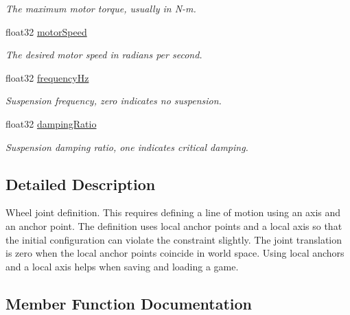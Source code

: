 \begin{DoxyCompactItemize}
\begin{DoxyCompactList}\small\item\em The maximum motor torque, usually in N-\/m. \end{DoxyCompactList}\item 
\mbox{\label{structb2WheelJointDef_a7248e25f2ca6b6c2a5f7079ce16e7748}} 
float32 \hyperlink{structb2WheelJointDef_a7248e25f2ca6b6c2a5f7079ce16e7748}{motor\+Speed}
\begin{DoxyCompactList}\small\item\em The desired motor speed in radians per second. \end{DoxyCompactList}\item 
\mbox{\label{structb2WheelJointDef_acf3540f46eaf3bc91426386939bd37b1}} 
float32 \hyperlink{structb2WheelJointDef_acf3540f46eaf3bc91426386939bd37b1}{frequency\+Hz}
\begin{DoxyCompactList}\small\item\em Suspension frequency, zero indicates no suspension. \end{DoxyCompactList}\item 
\mbox{\label{structb2WheelJointDef_a9976584bfee18b46dec355764797ce54}} 
float32 \hyperlink{structb2WheelJointDef_a9976584bfee18b46dec355764797ce54}{damping\+Ratio}
\begin{DoxyCompactList}\small\item\em Suspension damping ratio, one indicates critical damping. \end{DoxyCompactList}\end{DoxyCompactItemize}


\subsection{Detailed Description}
Wheel joint definition. This requires defining a line of motion using an axis and an anchor point. The definition uses local anchor points and a local axis so that the initial configuration can violate the constraint slightly. The joint translation is zero when the local anchor points coincide in world space. Using local anchors and a local axis helps when saving and loading a game. 

\subsection{Member Function Documentation}
\mbox{\label{structb2WheelJointDef_af26887092d36c3cd03898401a38783e2}} 

